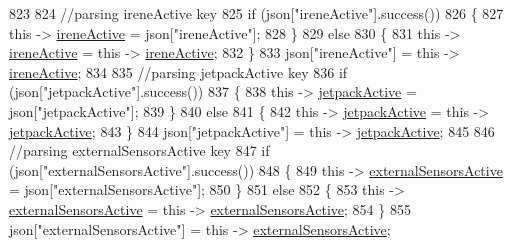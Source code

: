 \begin{DoxyCode}
823             
824             \textcolor{comment}{//parsing ireneActive key           }
825             \textcolor{keywordflow}{if} (json[\textcolor{stringliteral}{"ireneActive"}].success())
826             \{
827                 \textcolor{keyword}{this} -> \hyperlink{class_cool_board_a9c3f7ac625481ee2ae802a25d97a4ae0}{ireneActive} = json[\textcolor{stringliteral}{"ireneActive"}];
828             \}
829             \textcolor{keywordflow}{else}
830             \{
831                 \textcolor{keyword}{this} -> \hyperlink{class_cool_board_a9c3f7ac625481ee2ae802a25d97a4ae0}{ireneActive} = \textcolor{keyword}{this} -> \hyperlink{class_cool_board_a9c3f7ac625481ee2ae802a25d97a4ae0}{ireneActive};
832             \}
833             json[\textcolor{stringliteral}{"ireneActive"}] = \textcolor{keyword}{this} -> \hyperlink{class_cool_board_a9c3f7ac625481ee2ae802a25d97a4ae0}{ireneActive};
834             
835             \textcolor{comment}{//parsing jetpackActive key}
836             \textcolor{keywordflow}{if} (json[\textcolor{stringliteral}{"jetpackActive"}].success())
837             \{
838                 \textcolor{keyword}{this} -> \hyperlink{class_cool_board_a9be03a913d26e558328935ca3b59a75e}{jetpackActive} = json[\textcolor{stringliteral}{"jetpackActive"}];
839             \}
840             \textcolor{keywordflow}{else}
841             \{
842                 \textcolor{keyword}{this} -> \hyperlink{class_cool_board_a9be03a913d26e558328935ca3b59a75e}{jetpackActive} = \textcolor{keyword}{this} -> \hyperlink{class_cool_board_a9be03a913d26e558328935ca3b59a75e}{jetpackActive};
843             \}
844             json[\textcolor{stringliteral}{"jetpackActive"}] = \textcolor{keyword}{this} -> \hyperlink{class_cool_board_a9be03a913d26e558328935ca3b59a75e}{jetpackActive};
845 
846             \textcolor{comment}{//parsing externalSensorsActive key}
847             \textcolor{keywordflow}{if} (json[\textcolor{stringliteral}{"externalSensorsActive"}].success())
848             \{
849                 \textcolor{keyword}{this} -> \hyperlink{class_cool_board_a638b00b76aeb819ecfd4c10b8cdd7bb7}{externalSensorsActive} = json[\textcolor{stringliteral}{"externalSensorsActive"}];
850             \}
851             \textcolor{keywordflow}{else}
852             \{
853                 \textcolor{keyword}{this} -> \hyperlink{class_cool_board_a638b00b76aeb819ecfd4c10b8cdd7bb7}{externalSensorsActive} = \textcolor{keyword}{this} -> 
      \hyperlink{class_cool_board_a638b00b76aeb819ecfd4c10b8cdd7bb7}{externalSensorsActive};
854             \}
855             json[\textcolor{stringliteral}{"externalSensorsActive"}] = \textcolor{keyword}{this} -> \hyperlink{class_cool_board_a638b00b76aeb819ecfd4c10b8cdd7bb7}{externalSensorsActive};

\end{DoxyCode}

